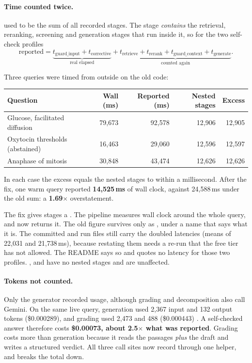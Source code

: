 \paragraph{Time counted twice.}  used to be the sum of all recorded stages. The  stage \emph{contains} the retrieval, reranking, screening and generation stages that run inside it, so for the two self-check profiles
\[
\text{reported} = \underbrace{t_{\text{guard\_input}} + t_{\text{corrective}}}_{\text{real elapsed}} + \underbrace{t_{\text{retrieve}} + t_{\text{rerank}} + t_{\text{guard\_context}} + t_{\text{generate}}}_{\text{counted again}}.
\]

\begin{measured}
Three  queries were timed from outside  on the old code:
\begin{center}\small
\begin{tabular}{@{}lrrrr@{}}
\toprule
\textbf{Question} & \textbf{Wall (ms)} & \textbf{Reported (ms)} & \textbf{Nested stages} & \textbf{Excess}\\
\midrule
Glucose, facilitated diffusion & 79,673 & 92,578 & 12,906 & 12,905\\
Oxytocin thresholds (abstained) & 16,463 & 29,060 & 12,596 & 12,597\\
Anaphase of mitosis & 30,848 & 43,474 & 12,626 & 12,626\\
\bottomrule
\end{tabular}
\end{center}
In each case the excess equals the nested stages to within a millisecond. After the fix, one warm query reported \textbf{14,525\,ms} of wall clock, against 24,588\,ms under the old sum: a \textbf{1.69$\times$} overstatement.
\end{measured}

The fix gives stages a . The pipeline measures wall clock around the whole query, and  now returns it. The old figure survives only as , under a name that says what it is. The committed  and  run files still carry the doubled latencies (means of 22,031 and 21,738\,ms), because restating them needs a re-run that the free tier has not allowed. The README says so and quotes no latency for those two profiles. ,  and  have no nested stages and are unaffected.

\paragraph{Tokens not counted.} Only the generator recorded usage, although grading and decomposition also call Gemini. On the same live query, generation used 2,367 input and 132 output tokens (\$0.000289), and grading used 2,473 and 488 (\$0.000443) \tagM. A self-checked answer therefore costs \textbf{\$0.00073, about 2.5$\times$ what was reported}. Grading costs more than generation because it reads the passages \emph{plus} the draft and writes a structured verdict. All three call sites now record through one helper, and  breaks the total down.

